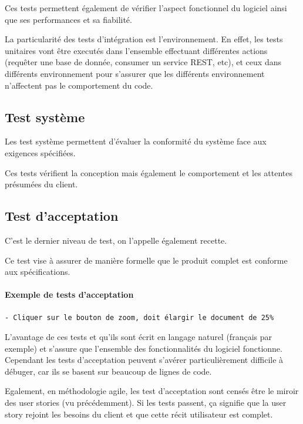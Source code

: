 Ces tests permettent également de vérifier l'aspect fonctionnel du logiciel ainsi que ses performances et sa fiabilité. 

La particularité des tests d'intégration est l'environnement.
En effet, les tests unitaires vont être executés dans l'ensemble effectuant différentes actions (requêter une base de donnée, consumer un service REST, etc), et ceux dans différents environnement pour s'assurer que les différents environnement n'affectent pas le comportement du code. 

\subsection{Test système}
Les test système permettent d'évaluer la conformité du système face aux exigences spécifiées.

Ces tests vérifient la conception mais également le comportement et les attentes présumées du client. 


\subsection{Test d'acceptation}
C'est le dernier niveau de test, on l'appelle également recette. 

Ce test vise à assurer de manière formelle que le produit complet est conforme aux spécifications. 

\paragraph{Exemple de tests d'acceptation}

\begin{verbatim}
- Cliquer sur le bouton de zoom, doit élargir le document de 25%
\end{verbatim}

L'avantage de ces tests et qu'ils sont écrit en langage naturel (français par exemple) et s'assure que l'ensemble des fonctionnalités du logiciel fonctionne. 
Cependant les tests d'acceptation peuvent s'avérer particulièrement difficile à débuger, car ils se basent sur beaucoup de lignes de code. 

Egalement, en méthodologie agile, les test d'acceptation sont censés être le miroir des user stories (vu précédemment). 
Si les tests passent, ça signifie que la user story rejoint les besoins du client et que cette récit utilisateur est complet. 


